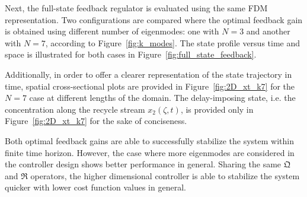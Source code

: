 Next, the full-state feedback regulator is evaluated using the same FDM representation. Two configurations are compared where the optimal feedback gain is obtained using different number of eigenmodes: one with $N=3$ and another with $N=7$, according to Figure~\ref{fig:k_modes}. The state profile versus time and space is illustrated for both cases in Figure~\ref{fig:full_state_feedback}. 

Additionally, in order to offer a clearer representation of the state trajectory in time, spatial cross-sectional plots are provided in Figure~\ref{fig:2D_xt_k7} for the $N=7$ case at different lengths of the domain. The delay-imposing state, i.e. the concentration along the recycle stream $x_2(\zeta,t)$, is provided only in Figure~\ref{fig:2D_xt_k7} for the sake of conciseness.

Both optimal feedback gains are able to successfully stabilize the system within finite time horizon. However, the case where more eigenmodes are considered in the controller design shows better performance in general. Sharing the same $\mathfrak{Q}$ and $\mathfrak{R}$ operators, the higher dimensional controller is able to stabilize the system quicker with lower cost function values in general.




